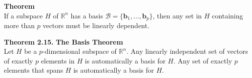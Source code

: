 \documentclass[10pt]{book}
\newcommand{\boxcolor}{gray!30}
\newenvironment{boxthm}{\begin{mdframed}[backgroundcolor=\boxcolor,nobreak=true]}{\end{mdframed}}
\theoremstyle{definition}
\newcommand{\B}{\mathscr{B}}
\newcommand{\vect}[1]{\ensuremath{\boldsymbol{\mathbf{#1}}}}
\newcommand{\vectset}[3][v]{\{\vect{#1}_{#2},\ldots,\vect{#1}_{#3}\}}
\begin{document}
\begin{boxthm}
	\textbf{Theorem} \\
	If a subspace $H$ of $\mathbb{R}^n$ has a basis $\B=\vectset[b]{1}{p}$, then any set in $H$ containing more than $p$ vectors must be linearly dependent.
\end{boxthm}
\vspace{-1em}
\begin{boxthm}
	\textbf{Theorem 2.15.}
	\textbf{The Basis Theorem} \\
	Let $H$ be a $p$-dimensional subspace of $\mathbb{R}^n$. Any linearly independent set of vectors of exactly $p$ elements in $H$ is automatically a basis for $H$. Any set of exactly $p$ elements that spans $H$ is automatically a basis for $H$.
\end{boxthm}
\end{document}
